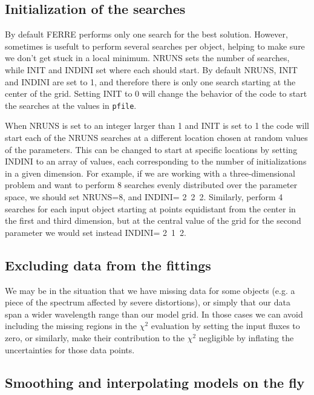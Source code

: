 \documentclass[12pt]{article}
\begin{document}
\subsection{Initialization of the searches}
\label{init}

By default FERRE performs only one search for the best solution.
However, sometimes is usefult to perform several searches per object,
helping to make sure we don't get stuck in a local minimum.
NRUNS sets the number of searches, while INIT and INDINI set where each should
start. By default NRUNS, INIT and INDINI are set to 1, and therefore there is
only one search starting at the center of the grid.
Setting INIT to 0 will change the behavior of the code to start the searches
at the values in {\tt pfile}. 

When NRUNS is set to an integer larger than
1 and INIT is set to 1 the code will start each of the NRUNS searches at a 
different location chosen at random values of the parameters. This can be changed 
to start at specific locations by setting INDINI to an array of values, each
corresponding to the number of initializations in a given dimension. For example,
if we are working with a three-dimensional problem and want to perform 8 searches
evenly distributed over the parameter space, we should set NRUNS=8, and
INDINI= 2~2~2.  Similarly, perform 4 searches for each input object 
starting at points equidistant from the center in the first and third dimension,
but at the central value of the grid for the second parameter we would set instead
INDINI= 2~1~2.

\subsection{Excluding data from the fittings}

We may be in the situation that we have missing data for some objects
(e.g. a piece of the spectrum affected by severe distortions), or
simply that our data span a wider wavelength range than our model grid.
In those cases  we can avoid including the missing regions in the 
$\chi^2$ evaluation by setting the input fluxes to zero, or similarly, 
make their contribution to the $\chi^2$ negligible by inflating the uncertainties
for those data points.

\subsection{Smoothing and interpolating models on the fly}
\end{document}
